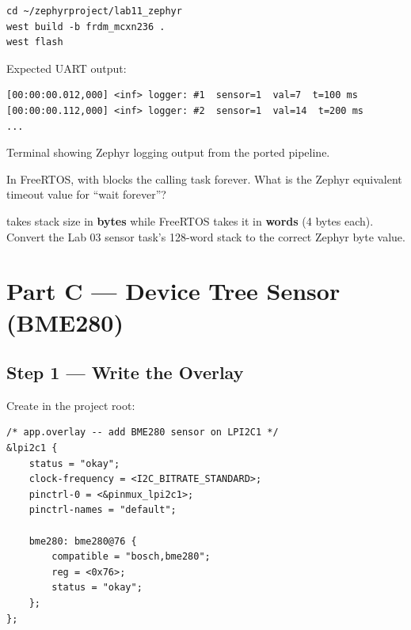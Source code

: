 \documentclass[11pt, a4paper]{article}
\begin{document}
\begin{lstlisting}[style=bashstyle]
cd ~/zephyrproject/lab11_zephyr
west build -b frdm_mcxn236 .
west flash
\end{lstlisting}

Expected UART output:

\begin{lstlisting}[style=textstyle]
[00:00:00.012,000] <inf> logger: #1  sensor=1  val=7  t=100 ms
[00:00:00.112,000] <inf> logger: #2  sensor=1  val=14  t=200 ms
...
\end{lstlisting}

\begin{checkpointbox}[~B]
  Terminal showing Zephyr logging output from the ported pipeline.
\end{checkpointbox}

\begin{questionbox}[~B1]
  In FreeRTOS,  with  blocks the calling task
  forever. What is the Zephyr equivalent timeout value for ``wait forever''?
\end{questionbox}

\begin{questionbox}[~B2]
   takes stack size in \textbf{bytes} while FreeRTOS
   takes it in \textbf{words} (4 bytes each). Convert the Lab 03
  sensor task's 128-word stack to the correct Zephyr byte value.
\end{questionbox}

\section{Part C --- Device Tree Sensor (BME280)}

\subsection{Step 1 --- Write the Overlay}

Create  in the project root:

\begin{lstlisting}[style=textstyle]
/* app.overlay -- add BME280 sensor on LPI2C1 */
&lpi2c1 {
    status = "okay";
    clock-frequency = <I2C_BITRATE_STANDARD>;
    pinctrl-0 = <&pinmux_lpi2c1>;
    pinctrl-names = "default";

    bme280: bme280@76 {
        compatible = "bosch,bme280";
        reg = <0x76>;
        status = "okay";
    };
};
\end{lstlisting}
\end{document}
